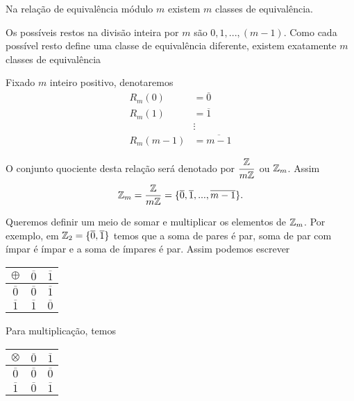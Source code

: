 \begin{proposicao}
    Na relação de equivalência módulo $m$ existem $m$ classes de equivalência.
\end{proposicao}
\begin{prova}
    Os possíveis restos na divisão inteira por $m$ são $0,1,...,(m-1)$. Como cada possível resto define uma classe de equivalência diferente, existem exatamente $m$ classes de equivalência
\end{prova}

\begin{observacao}
Fixado $m$ inteiro positivo, denotaremos
\begin{align*}
    R_{m}(0) &= \overline{0}\\
    R_{m}(1) &= \overline{1}\\
    &\vdots\\
    R_{m}(m-1) &= \overline{m-1}
\end{align*}

O conjunto quociente desta relação ser{\'a} denotado por $\displaystyle\frac{\mathbb{Z}}{m\mathbb{Z}}$ ou $\mathbb{Z}_m$. Assim
\[
    \mathbb{Z}_m = \displaystyle\frac{\mathbb{Z}}{m\mathbb{Z}}=\{\overline{0},\overline{1},...,\overline{m-1}\}.
\]
\end{observacao}

Queremos definir um meio de somar e multiplicar os elementos de $\mathbb{Z}_m$. Por exemplo, em $\mathbb{Z}_2 = \{\overline{0},\overline{1}\}$ temos que a soma de pares é par, soma de par com ímpar é ímpar e a soma de ímpares é par. Assim podemos escrever

\begin{table}[h]
   \centering
   \setlength{\arrayrulewidth}{0,5\arrayrulewidth}
   \begin{tabular}{|c|c|c|}
      \hline
      $\oplus$ & $\overline{0}$ & $\overline{1}$ \T\\
      \hline
      $\overline{0}$ & $\overline{0}$ & $\overline{1}$\T\\
      \hline
      $\overline{1}$ & $\overline{1}$ & $\overline{0}$\T\\
      \hline
   \end{tabular}
\end{table}

Para multiplicação, temos

\begin{table}[h]
   \centering
   \setlength{\arrayrulewidth}{0,5\arrayrulewidth}
   \begin{tabular}{|c|c|c|}
      \hline
      $\otimes$ & $\overline{0}$ & $\overline{1}$\T\\
      \hline
      $\overline{0}$ & $\overline{0}$ & $\overline{0}$\T\\
      \hline
      $\overline{1}$ & $\overline{0}$ & $\overline{1}$\T\\
      \hline
   \end{tabular}
\end{table}

